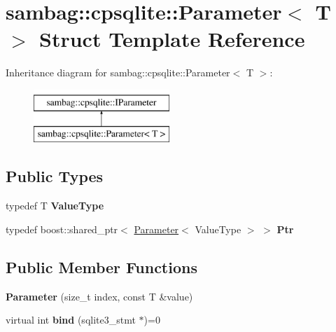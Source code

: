 \hypertarget{structsambag_1_1cpsqlite_1_1_parameter}{
\section{sambag::cpsqlite::Parameter$<$ T $>$ Struct Template Reference}
\label{structsambag_1_1cpsqlite_1_1_parameter}
}
Inheritance diagram for sambag::cpsqlite::Parameter$<$ T $>$:\begin{figure}[H]
\begin{center}
\leavevmode
\includegraphics[height=2.000000cm]{structsambag_1_1cpsqlite_1_1_parameter}
\end{center}
\end{figure}
\subsection*{Public Types}
\begin{DoxyCompactItemize}
\item 
\hypertarget{structsambag_1_1cpsqlite_1_1_parameter_a8004b50c89646e2810869a0a77db47ee}{
typedef T {\bfseries ValueType}}
\label{structsambag_1_1cpsqlite_1_1_parameter_a8004b50c89646e2810869a0a77db47ee}

\item 
\hypertarget{structsambag_1_1cpsqlite_1_1_parameter_a7d759b26be7993f6e685fbe050fca588}{
typedef boost::shared\_\-ptr$<$ \hyperlink{structsambag_1_1cpsqlite_1_1_parameter}{Parameter}$<$ ValueType $>$ $>$ {\bfseries Ptr}}
\label{structsambag_1_1cpsqlite_1_1_parameter_a7d759b26be7993f6e685fbe050fca588}

\end{DoxyCompactItemize}
\subsection*{Public Member Functions}
\begin{DoxyCompactItemize}
\item 
\hypertarget{structsambag_1_1cpsqlite_1_1_parameter_a34d2f018543d53067b5dbbca8deb9ac9}{
{\bfseries Parameter} (size\_\-t index, const T \&value)}
\label{structsambag_1_1cpsqlite_1_1_parameter_a34d2f018543d53067b5dbbca8deb9ac9}

\item 
\hypertarget{structsambag_1_1cpsqlite_1_1_parameter_aba965bd74f980f8959455b798af1728d}{
virtual int {\bfseries bind} (sqlite3\_\-stmt $\ast$)=0}
\label{structsambag_1_1cpsqlite_1_1_parameter_aba965bd74f980f8959455b798af1728d}

\end{DoxyCompactItemize}
